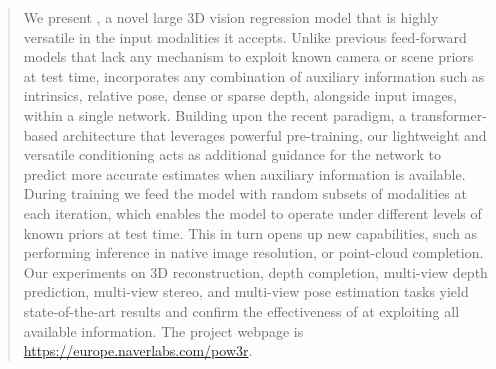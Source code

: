 \begin{abstract}
\vspace{-0.5cm}

We present \ours{}, a novel large 3D vision regression model that is highly versatile in the input modalities it accepts. Unlike previous feed-forward models that lack any mechanism to exploit known camera or scene priors at test time, \ours{} incorporates any combination of auxiliary information such as intrinsics, relative pose, dense or sparse depth, alongside input images, within a single network. 
Building upon the recent \duster{} paradigm, a transformer-based architecture that leverages powerful pre-training, %
our lightweight and versatile conditioning acts as additional guidance for the network to predict more accurate estimates when auxiliary information is available. 
During training we feed the model with random subsets of modalities at each iteration, which enables the model to operate under different levels of known priors at test time.
This in turn opens up new capabilities, such as performing inference in native image resolution, or point-cloud completion.
Our experiments on 3D reconstruction, depth completion, multi-view depth prediction, multi-view stereo, and multi-view pose estimation tasks yield state-of-the-art results and confirm the effectiveness of \ours{} at exploiting all %
available information.
The project webpage is \href{https://europe.naverlabs.com/pow3r}{https://europe.naverlabs.com/pow3r}.



\vspace{-0.5cm}
\end{abstract}